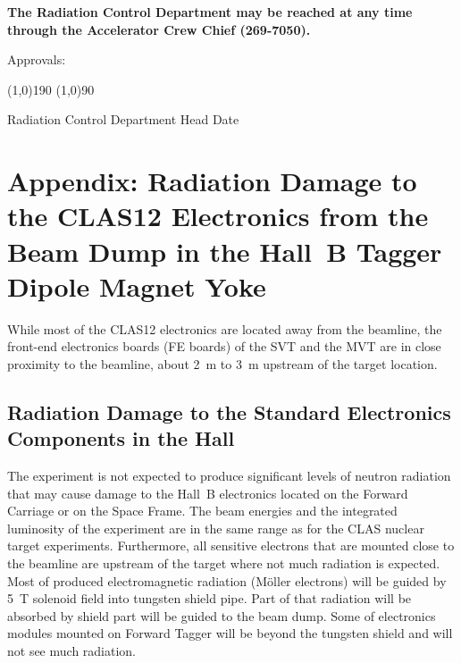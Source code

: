 \documentclass [12pt]{article}
\begin{document}
{\bf The Radiation Control Department may be reached at any time through the
Accelerator Crew Chief (269-7050). }

\vspace{3.cm}
Approvals:

\vspace{1.cm}
\line(1,0){190}                    
\hspace{3cm}         \line(1,0){90}  

Radiation Control Department Head               \hspace{3cm}                  Date


\clearpage
\section{Appendix: Radiation Damage to the CLAS12 Electronics from the Beam Dump in the Hall~B 
Tagger Dipole Magnet Yoke}

While most of the CLAS12 electronics are located away from the beamline, the front-end electronics 
boards (FE boards) of the SVT and the MVT are in close proximity to the beamline, about 2~m to 3~m 
upstream of the target location. 

\subsection{Radiation Damage to the Standard Electronics Components in the Hall}

The experiment is not expected to produce significant levels of neutron radiation that may cause 
damage to the Hall~B electronics located on the Forward Carriage or on the Space Frame. The beam 
energies and the integrated luminosity of the experiment are in the same range as for the CLAS 
nuclear target experiments. Furthermore, all sensitive electrons that are mounted close to the 
beamline are upstream of the target where not much radiation is expected. Most of produced 
electromagnetic radiation (M{\"o}ller electrons) will be guided by 5~T solenoid field into tungsten 
shield pipe. Part of that radiation will be absorbed by shield part will be guided to the beam 
dump. Some of electronics modules mounted on Forward Tagger will be beyond the tungsten shield 
and will not see much radiation. 
\end{document}

